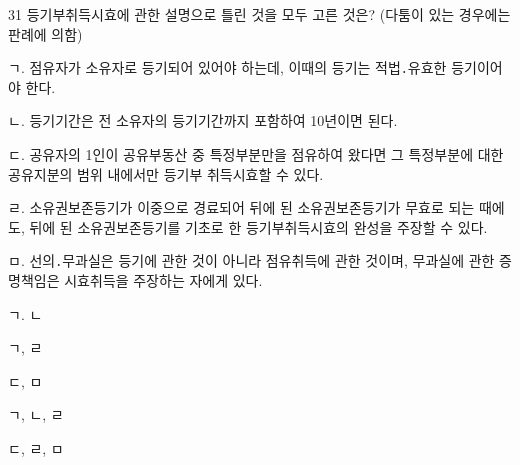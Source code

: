 \begin{question}{31}
등기부취득시효에 관한 설명으로 틀린 것을 모두 고른 것은? (다툼이 있는 경우에는 판례에 의함)
\begin{framedtext}
ㄱ. 점유자가 소유자로 등기되어 있어야 하는데, 이때의 등기는 적법․유효한 등기이어야 한다. \par
ㄴ. 등기기간은 전 소유자의 등기기간까지 포함하여 10년이면 된다. \par
ㄷ. 공유자의 1인이 공유부동산 중 특정부분만을 점유하여 왔다면 그 특정부분에 대한 공유지분의 범위 내에서만 등기부 취득시효할 수 있다. \par
ㄹ. 소유권보존등기가 이중으로 경료되어 뒤에 된 소유권보존등기가 무효로 되는 때에도, 뒤에 된 소유권보존등기를 기초로 한 등기부취득시효의 완성을 주장할 수 있다. \par
ㅁ. 선의․무과실은 등기에 관한 것이 아니라 점유취득에 관한 것이며, 무과실에 관한 증명책임은 시효취득을 주장하는 자에게 있다.
\end{framedtext}
\begin{choices}
  \item ㄱ. ㄴ
  \item ㄱ, ㄹ
  \item ㄷ, ㅁ
  \item ㄱ, ㄴ, ㄹ
  \item ㄷ, ㄹ, ㅁ
\end{choices}
\end{question}
